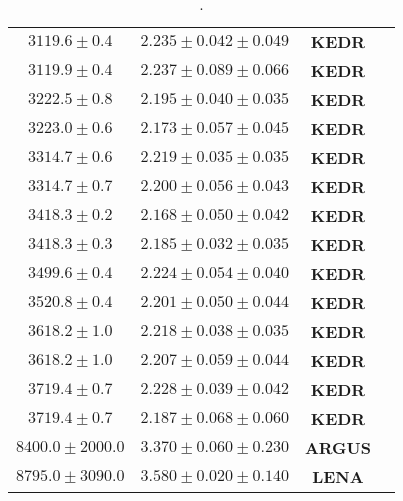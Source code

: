 \begin{table}[!h]
\begin{tabular}{|cccc|}
$3119.6\pm 0.4$	& $2.235 \pm 0.042\pm 0.049$ &  \textbf{KEDR} & \cite{RRKerd}\\
$3119.9\pm 0.4$	& $2.237 \pm 0.089\pm 0.066$ &  \textbf{KEDR} & \cite{RRKerd2}\\
$3222.5\pm 0.8$ & $2.195 \pm 0.040\pm 0.035$ &  \textbf{KEDR} & \cite{RRKerd}\\
$3223.0\pm 0.6$ & $2.173 \pm 0.057\pm 0.045$ &  \textbf{KEDR} & \cite{RRKerd2}\\
$3314.7\pm 0.6$	& $2.219 \pm 0.035\pm 0.035$ &  \textbf{KEDR} & \cite{RRKerd}\\
$3314.7\pm 0.7$	& $2.200 \pm 0.056\pm 0.043$ &  \textbf{KEDR} & \cite{RRKerd2}\\
$3418.3\pm 0.2$ & $2.168 \pm 0.050\pm 0.042$ &  \textbf{KEDR} & \cite{RRKerd2}\\
$3418.3\pm 0.3$ & $2.185 \pm 0.032\pm 0.035$ &  \textbf{KEDR} & \cite{RRKerd}\\
$3499.6\pm 0.4$ & $2.224 \pm 0.054\pm 0.040$ &  \textbf{KEDR} & \cite{RRKerd}\\
$3520.8\pm 0.4$	& $2.201 \pm 0.050\pm 0.044$ &  \textbf{KEDR} & \cite{RRKerd}\\
$3618.2\pm 1.0$ & $2.218 \pm 0.038\pm 0.035$ &  \textbf{KEDR} & \cite{RRKerd}\\
$3618.2\pm 1.0$ & $2.207 \pm 0.059\pm 0.044$ &  \textbf{KEDR} & \cite{RRKerd2}\\
$3719.4\pm 0.7$ & $2.228 \pm 0.039\pm 0.042$ &  \textbf{KEDR} & \cite{RRKerd}\\
$3719.4\pm 0.7$ & $2.187 \pm 0.068\pm 0.060$ &  \textbf{KEDR} & \cite{RRKerd2}\\

$8400.0\pm 2000.0$ & $3.370 \pm 0.060\pm 0.230$ &  \textbf{ARGUS} & \cite{R8}\\%
$8795.0\pm 3090.0$ & $3.580 \pm 0.020\pm 0.140$ &  \textbf{LENA} & \cite{R8}\\%
\bottomrule 
\end{tabular}
\caption{.}
\label{rvalues}
\end{table}
